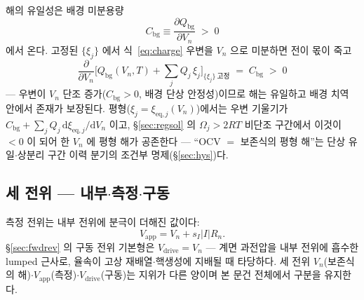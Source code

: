 \documentclass[11pt,a4paper]{article}
\newcommand{\dd}{\mathrm{d}}
\newcommand{\eq}{\mathrm{eq}}
\newcommand{\app}{\mathrm{app}}
\newcommand{\drive}{\mathrm{drive}}
\newcommand{\bg}{\mathrm{bg}}
\begin{document}
해의 유일성은 배경 미분용량
\begin{equation}
C_\bg\equiv\frac{\partial Q_\bg}{\partial V_n}\;>\;0
\label{eq:cbg}
\end{equation}
에서 온다. 고정된 $\{\xi_j\}$ 에서 식~\eqref{eq:charge} 우변을 $V_n$ 으로 미분하면 전이 몫이 죽고
\begin{equation}
\frac{\partial}{\partial V_n}\Big[Q_\bg(V_n,T)+\sum_jQ_j\,\xi_j\Big]_{\{\xi_j\}\ \text{고정}}
\;=\;C_\bg\;>\;0
\label{eq:unique}
\end{equation}
— 우변이 $V_n$ 단조 증가($C_\bg>0$, 배경 단상 안정성)이므로 해는 유일하고 배경 치역 안에서 존재가 보장된다. 평형($\xi_j=\xi_{\eq,j}(V_n)$)에서는 우변 기울기가 $C_\bg+\sum_jQ_j\,\dd\xi_{\eq,j}/\dd V_n$ 이고, \S\ref{sec:regsol} 의 $\Omega_j>2RT$ 비단조 구간에서 이것이 $<0$ 이 되어 한 $V_n$ 에 평형 해가 공존한다 — ``OCV $=$ 보존식의 평형 해''는 단상 유일$\cdot$상분리 구간 이력 분기의 조건부 명제(\S\ref{sec:hys})다.

\subsection{세 전위 — 내부$\cdot$측정$\cdot$구동}
측정 전위는 내부 전위에 분극이 더해진 값이다:
\begin{equation}
V_\app=V_n+s_I|I|R_n.
\label{eq:vapp}
\end{equation}
\S\ref{sec:fwdrev} 의 구동 전위 기본형은 $V_\drive=V_n$ — 계면 과전압을 내부 전위에 흡수한 lumped 근사로, 율속이 고상 재배열$\cdot$핵생성에 지배될 때 타당하다. 세 전위 $V_n$(보존식의 해)$\cdot$$V_\app$(측정)$\cdot$$V_\drive$(구동)는 지위가 다른 양이며 본 문건 전체에서 구분을 유지한다.
\end{document}

